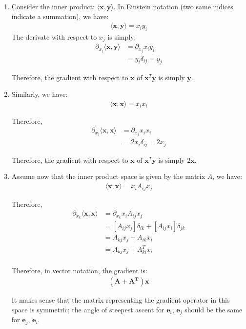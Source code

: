 \documentclass[submit]{harvardml}
\renewcommand{\v}[1]{\mathbf{#1}}
\begin{document}
\begin{enumerate}[label=(\alph*)]
	\item Consider the inner product: $\langle \v{x}, \v{y} \rangle$. In Einstein notation (two same indices indicate a summation), we have:
	\begin{align}
		\langle \v{x}, \v{y} \rangle = x_i y_i
	\end{align}
	The derivate with respect to $x_j$ is simply:
	\begin{align}
		\partial_{x_j} \langle \v{x}, \v{y} \rangle &= \partial_{x_j}  x_i y_i \\
		&= y_i \delta_{ij} = y_j
	\end{align}
	
	Therefore, the gradient with respect to $\v x$ of $\v x^T \v y$ is simply $\v{y}$.
	
	\item Similarly, we have:
		\begin{align}
			\langle \v{x}, \v{x} \rangle = x_i x_i
		\end{align}
		
		Therefore,
		\begin{align}
		\partial_{x_j} \langle \v{x}, \v{x} \rangle &= \partial_{x_j}  x_i x_i \\
		&= 2 x_i \delta_{ij} = 2 x_j
	\end{align}
	
	Therefore, the gradient with respect to $\v x$ of $\v x^T \v y$ is simply $2 \v{x}$.
	
	\item Assume now that the inner product space is given by the matrix $A$, we have:
		\begin{align}
			\langle \v{x}, \v{x} \rangle = x_i A_{ij} x_j
		\end{align}
		
		Therefore,
		\begin{align}
		\partial_{x_k} \langle \v{x}, \v{x} \rangle &= \partial_{x_k}  x_i A_{ij} x_j \\
		&= \left[A_{ij}x_j \right]\delta_{ik} + \left[A_{ij} x_i \right] \delta_{jk} \\
		&= A_{kj} x_j + A_{ik}x_i \\
		&= A_{kj} x_j + A^T_{ki}x_i \\
		\end{align}
		
		Therefore, in vector notation, the gradient is:
		\begin{align}
			\v{(A + A^T) x}
		\end{align}
		
		It makes sense that the matrix representing the gradient operator in this space is symmetric; the angle of steepest ascent for $\v e_i$, $\v e_j$ should be the same for $\v e_j$, $\v e_i$. 
	
\end{enumerate}
\newpage
\end{document}
